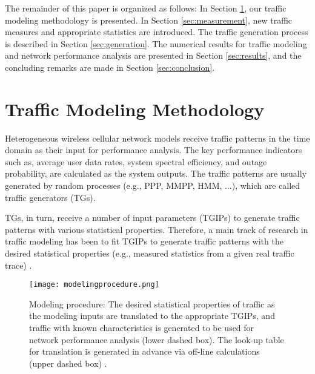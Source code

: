 \documentclass[journal]{IEEEtran}
\begin{document}
The remainder of this paper is organized as follows: In Section \ref{sec:methodology}, our traffic modeling methodology is presented. In Section \ref{sec:measurement}, new traffic measures and appropriate statistics are introduced. The traffic generation process is described in Section \ref{sec:generation}. The numerical results for traffic modeling and network performance analysis are presented in Section \ref{sec:results}, and the concluding remarks are made in Section \ref{sec:conclusion}.























\section{Traffic Modeling Methodology}
\label{sec:methodology}

Heterogeneous wireless cellular network models receive traffic patterns in the time domain as their input for performance analysis. The key performance indicators such as, average user data rates, system spectral efficiency, and outage probability, are calculated as the system outputs. The traffic patterns are usually generated by random processes (e.g., PPP, MMPP, HMM, ...), which are called traffic generators (TGs).

TGs, in turn, receive a number of input parameters (TGIPs) to generate traffic patterns with various statistical properties. Therefore, a main track of research in traffic modeling has been to fit TGIPs to generate traffic patterns with the desired statistical properties (e.g., measured statistics from a given real traffic trace) \cite{andersen1998markovian, casale2008interarrival, xie2012modeling}.

\begin{figure*}
\centering
\texttt{[image: modelingprocedure.png]}
\caption{Modeling procedure: The desired statistical properties of traffic as the modeling inputs are translated to the appropriate TGIPs, and traffic with known characteristics is generated to be used for network performance analysis (lower dashed box). The look-up table for translation is generated in advance via off-line calculations (upper dashed box) \cite{mirahsan_gc14}.}
\label{fig:modelingprocedure}
\end{figure*}
\end{document}

